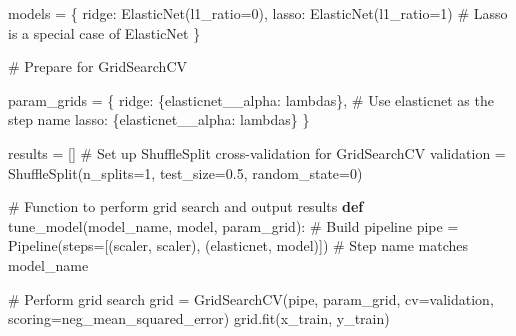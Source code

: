 \documentclass[
  letterpaper,
  DIV=11,
  numbers=noendperiod]{scrreprt}
\newenvironment{Shaded}{\begin{snugshade}}{\end{snugshade}}
\newcommand{\CommentTok}[1]{\textcolor[rgb]{0.37,0.37,0.37}{#1}}
\newcommand{\DecValTok}[1]{\textcolor[rgb]{0.68,0.00,0.00}{#1}}
\newcommand{\FloatTok}[1]{\textcolor[rgb]{0.68,0.00,0.00}{#1}}
\newcommand{\KeywordTok}[1]{\textcolor[rgb]{0.00,0.23,0.31}{\textbf{#1}}}
\newcommand{\NormalTok}[1]{\textcolor[rgb]{0.00,0.23,0.31}{#1}}
\newcommand{\OperatorTok}[1]{\textcolor[rgb]{0.37,0.37,0.37}{#1}}
\newcommand{\StringTok}[1]{\textcolor[rgb]{0.13,0.47,0.30}{#1}}
\begin{document}
\begin{Shaded}
\begin{Highlighting}[]

\NormalTok{models }\OperatorTok{=}\NormalTok{ \{}
    \StringTok{\textquotesingle{}ridge\textquotesingle{}}\NormalTok{: ElasticNet(l1\_ratio}\OperatorTok{=}\DecValTok{0}\NormalTok{),}
    \StringTok{\textquotesingle{}lasso\textquotesingle{}}\NormalTok{: ElasticNet(l1\_ratio}\OperatorTok{=}\DecValTok{1}\NormalTok{)  }\CommentTok{\# Lasso is a special case of ElasticNet}
\NormalTok{\}}

\CommentTok{\# Prepare for GridSearchCV}

\NormalTok{param\_grids }\OperatorTok{=}\NormalTok{ \{}
    \StringTok{\textquotesingle{}ridge\textquotesingle{}}\NormalTok{: \{}\StringTok{\textquotesingle{}elasticnet\_\_alpha\textquotesingle{}}\NormalTok{: lambdas\},  }\CommentTok{\# Use \textquotesingle{}elasticnet\textquotesingle{} as the step name}
    \StringTok{\textquotesingle{}lasso\textquotesingle{}}\NormalTok{: \{}\StringTok{\textquotesingle{}elasticnet\_\_alpha\textquotesingle{}}\NormalTok{: lambdas\}}
\NormalTok{\}}

\NormalTok{results }\OperatorTok{=}\NormalTok{ []}
\CommentTok{\# Set up ShuffleSplit cross{-}validation for GridSearchCV}
\NormalTok{validation }\OperatorTok{=}\NormalTok{ ShuffleSplit(n\_splits}\OperatorTok{=}\DecValTok{1}\NormalTok{, test\_size}\OperatorTok{=}\FloatTok{0.5}\NormalTok{, random\_state}\OperatorTok{=}\DecValTok{0}\NormalTok{)}

\CommentTok{\# Function to perform grid search and output results}
\KeywordTok{def}\NormalTok{ tune\_model(model\_name, model, param\_grid):}
    \CommentTok{\# Build pipeline}
\NormalTok{    pipe }\OperatorTok{=}\NormalTok{ Pipeline(steps}\OperatorTok{=}\NormalTok{[(}\StringTok{\textquotesingle{}scaler\textquotesingle{}}\NormalTok{, scaler), (}\StringTok{\textquotesingle{}elasticnet\textquotesingle{}}\NormalTok{, model)])  }\CommentTok{\# Step name matches model\_name}
    
    \CommentTok{\# Perform grid search}
\NormalTok{    grid }\OperatorTok{=}\NormalTok{ GridSearchCV(pipe, param\_grid, cv}\OperatorTok{=}\NormalTok{validation, scoring}\OperatorTok{=}\StringTok{\textquotesingle{}neg\_mean\_squared\_error\textquotesingle{}}\NormalTok{)}
\NormalTok{    grid.fit(x\_train, y\_train)}
    

\end{Highlighting}
\end{Shaded}
\end{document}
